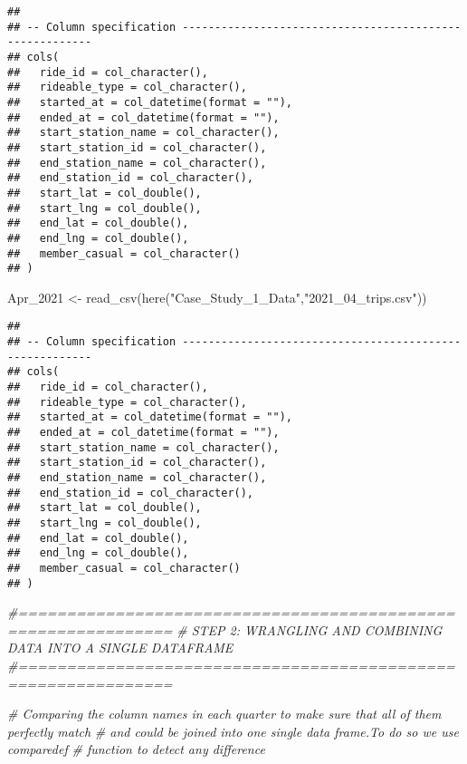 \documentclass[
]{article}
\newenvironment{Shaded}{\begin{snugshade}}{\end{snugshade}}
\newcommand{\CommentTok}[1]{\textcolor[rgb]{0.56,0.35,0.01}{\textit{#1}}}
\newcommand{\FunctionTok}[1]{\textcolor[rgb]{0.00,0.00,0.00}{#1}}
\newcommand{\NormalTok}[1]{#1}
\newcommand{\OtherTok}[1]{\textcolor[rgb]{0.56,0.35,0.01}{#1}}
\newcommand{\StringTok}[1]{\textcolor[rgb]{0.31,0.60,0.02}{#1}}
\begin{document}
\begin{verbatim}
## 
## -- Column specification --------------------------------------------------------
## cols(
##   ride_id = col_character(),
##   rideable_type = col_character(),
##   started_at = col_datetime(format = ""),
##   ended_at = col_datetime(format = ""),
##   start_station_name = col_character(),
##   start_station_id = col_character(),
##   end_station_name = col_character(),
##   end_station_id = col_character(),
##   start_lat = col_double(),
##   start_lng = col_double(),
##   end_lat = col_double(),
##   end_lng = col_double(),
##   member_casual = col_character()
## )
\end{verbatim}

\begin{Shaded}
\begin{Highlighting}[]
\NormalTok{ Apr\_2021 }\OtherTok{\textless{}{-}} \FunctionTok{read\_csv}\NormalTok{(}\FunctionTok{here}\NormalTok{(}\StringTok{"Case\_Study\_1\_Data"}\NormalTok{,}\StringTok{"2021\_04\_trips.csv"}\NormalTok{)) }
\end{Highlighting}
\end{Shaded}

\begin{verbatim}
## 
## -- Column specification --------------------------------------------------------
## cols(
##   ride_id = col_character(),
##   rideable_type = col_character(),
##   started_at = col_datetime(format = ""),
##   ended_at = col_datetime(format = ""),
##   start_station_name = col_character(),
##   start_station_id = col_character(),
##   end_station_name = col_character(),
##   end_station_id = col_character(),
##   start_lat = col_double(),
##   start_lng = col_double(),
##   end_lat = col_double(),
##   end_lng = col_double(),
##   member_casual = col_character()
## )
\end{verbatim}

\begin{Shaded}
\begin{Highlighting}[]
\CommentTok{\#==============================================================}
\CommentTok{\# STEP 2: WRANGLING AND COMBINING DATA INTO A SINGLE DATAFRAME}
\CommentTok{\#==============================================================}

\CommentTok{\# Comparing the column names in each quarter to make sure that all of them perfectly match}
\CommentTok{\# and could be joined into one single data frame.To do so we use comparedef}
\CommentTok{\# function to detect any difference}
\end{Highlighting}
\end{Shaded}
\end{document}
